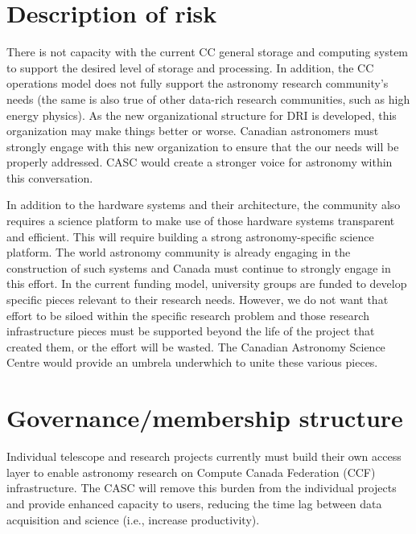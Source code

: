 \documentclass[11pt]{article}
\begin{document}
\section{Description of risk}
There is not capacity with the current CC general storage and computing system to support the desired level of storage and processing.  In addition, the CC operations model does not fully support the astronomy research community's needs (the same is also true of other data-rich research communities, such as high energy physics).   As the new organizational structure for DRI is developed, this organization may make things better or worse. Canadian astronomers must strongly engage with this new organization to ensure that the our needs will be properly addressed.  CASC would create a stronger voice for astronomy within this conversation.

In addition to the hardware systems and their architecture, the community also requires a science platform to make use of those hardware systems transparent and efficient.   This will require building a strong astronomy-specific science platform.  The world astronomy community is already engaging in the construction of such systems and Canada must continue to strongly engage in this effort.  In the current funding model, university groups are funded to develop specific pieces relevant to their research needs.  However, we do not want that effort to be siloed within the specific research problem and those research infrastructure pieces must be supported beyond the life of the project that created them, or the effort will be wasted.  The Canadian Astronomy Science Centre would provide an umbrela underwhich to unite these various pieces.

\section{Governance/membership structure}

\begin{lrptextbox}
Individual telescope and research projects currently must build their own access layer to enable astronomy research on Compute Canada Federation (CCF) infrastructure.  The CASC will remove this burden from the individual projects and provide enhanced capacity to users, reducing the time lag between data acquisition and science (i.e., increase productivity).
\end{lrptextbox}
\end{document}
